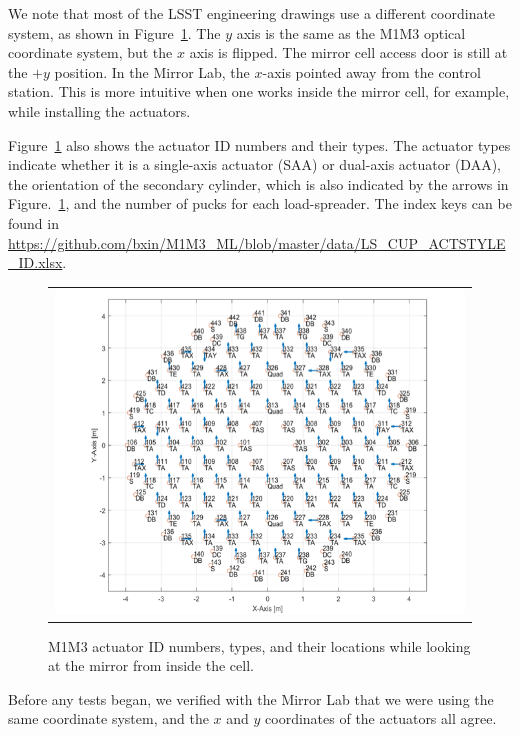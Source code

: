 \documentclass [twoside,openbib,12pt]{article}
\begin{document}
We note that most of the LSST engineering drawings use a different
coordinate system, as shown in Figure~\ref{fig:actMap}.
The $y$ axis is the same as the M1M3 optical coordinate system, but
the $x$ axis is flipped.
The mirror cell access door is still at the $+y$ position.
In the Mirror Lab, the $x$-axis pointed away from the control station.
This is more intuitive when one works inside the mirror cell, for
example, while installing the actuators.

Figure~\ref{fig:actMap} also shows the actuator
 ID numbers and their types.
The actuator types indicate whether it is a single-axis actuator (SAA)
or dual-axis actuator (DAA), the orientation of the secondary
cylinder, which is also indicated by the arrows in
Figure.~\ref{fig:actMap}, and the number of pucks for each
load-spreader.
The index keys can be found in \url{https://github.com/bxin/M1M3_ML/blob/master/data/LS_CUP_ACTSTYLE_ID.xlsx}.

  \begin{figure}[bthp]
   \begin{center}
   \begin{tabular}{c}
\includegraphics[width=140mm]{figures/actMap.png}
  \end{tabular}
   \end{center}
   \caption
  { \label{fig:actMap}
M1M3 actuator ID numbers, types, and their locations while looking at the mirror from inside the cell.
 }
\end{figure}

Before any tests began, we verified with the Mirror Lab that we were
using the same coordinate system, and the $x$ and $y$ coordinates of
the actuators all agree.
\end{document}
